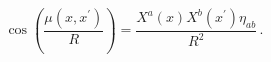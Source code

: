 \begin{equation}
\cos \left( \frac{\mu (x, x^{\prime})}{R} \right) = \frac{X^a (x) X^b (x^{\prime}) \eta_{a b}}{R^2} \, .
\end{equation}

